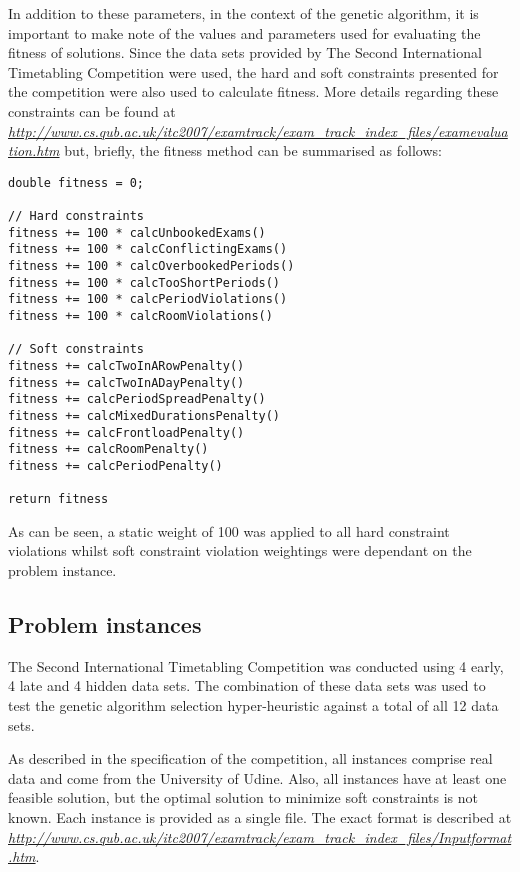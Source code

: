 \documentclass[conference]{IEEEtran}
\begin{document}
In addition to these parameters, in the context of the genetic algorithm, it is important to make note of the values and parameters used for evaluating the fitness of solutions. Since the data sets provided by The Second International Timetabling Competition \cite{mccollum2010setting} were used, the hard and soft constraints presented for the competition were also used to calculate fitness. More details regarding these constraints can be found at \emph{\url{http://www.cs.qub.ac.uk/itc2007/examtrack/exam_track_index_files/examevaluation.htm}} but, briefly, the fitness method can be summarised as follows:
\begin{lstlisting}
double fitness = 0;

// Hard constraints
fitness += 100 * calcUnbookedExams()
fitness += 100 * calcConflictingExams()
fitness += 100 * calcOverbookedPeriods()
fitness += 100 * calcTooShortPeriods()
fitness += 100 * calcPeriodViolations()
fitness += 100 * calcRoomViolations()

// Soft constraints
fitness += calcTwoInARowPenalty()
fitness += calcTwoInADayPenalty()
fitness += calcPeriodSpreadPenalty()
fitness += calcMixedDurationsPenalty()
fitness += calcFrontloadPenalty()
fitness += calcRoomPenalty()
fitness += calcPeriodPenalty()

return fitness
\end{lstlisting}

As can be seen, a static weight of 100 was applied to all hard constraint violations whilst soft constraint violation weightings were dependant on the problem instance.

\subsection{Problem instances}

The Second International Timetabling Competition \cite{mccollum2010setting} was conducted using 4 early, 4 late and 4 hidden data sets. The combination of these data sets was used to test the genetic algorithm selection hyper-heuristic against a total of all 12 data sets.

As described in the specification of the competition, all instances comprise real data and come from the University of Udine. Also, all instances have at least one feasible solution, but the optimal solution to minimize soft constraints is not known. Each instance is provided as a single file. The exact format is described at \emph{\url{http://www.cs.qub.ac.uk/itc2007/examtrack/exam_track_index_files/Inputformat.htm}}.
\end{document}
